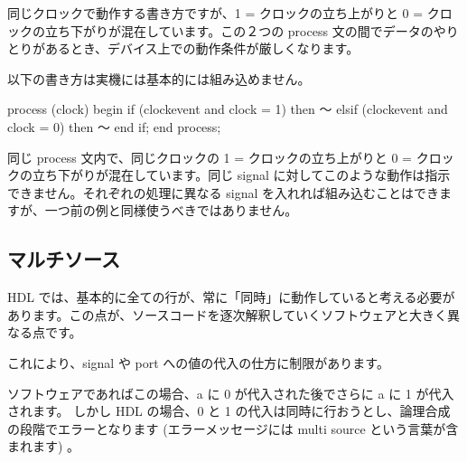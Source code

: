 \documentclass[letterpaper,10pt,dvipdfmx]{sphinxmanual}
\begin{document}
同じクロックで動作する書き方ですが、1 = クロックの立ち上がりと 0 = クロックの立ち下がりが混在しています。この２つの process 文の間でデータのやりとりがあるとき、デバイス上での動作条件が厳しくなります。

以下の書き方は実機には基本的には組み込めません。

\begin{sphinxVerbatim}[commandchars=\\\{\}]
process (clock)
begin
  if (clock\PYGZsq{}event and clock = \PYGZsq{}1\PYGZsq{}) then
    ～
  elsif (clock\PYGZsq{}event and clock = \PYGZsq{}0\PYGZsq{}) then
    ～
  end if;
end process;
\end{sphinxVerbatim}

同じ process 文内で、同じクロックの 1 = クロックの立ち上がりと 0 = クロックの立ち下がりが混在しています。同じ signal に対してこのような動作は指示できません。それぞれの処理に異なる signal を入れれば組み込むことはできますが、一つ前の例と同様使うべきではありません。


\subsection{マルチソース}
\label{\detokenize{05_try:id12}}
HDL では、基本的に全ての行が、常に「同時」に動作していると考える必要があります。この点が、ソースコードを逐次解釈していくソフトウェアと大きく異なる点です。

これにより、signal や port への値の代入の仕方に制限があります。

\begin{sphinxVerbatim}[commandchars=\\\{\}]
    
     
    
    
 
\end{sphinxVerbatim}

ソフトウェアであればこの場合、a に 0 が代入された後でさらに a に 1 が代入されます。
しかし HDL の場合、0 と 1 の代入は同時に行おうとし、論理合成の段階でエラーとなります (エラーメッセージには multi source という言葉が含まれます) 。
\end{document}
